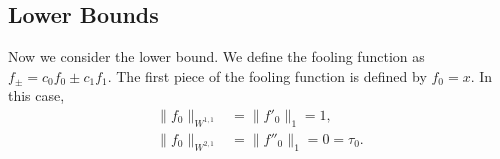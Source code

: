 %
%
%
%


\subsection{Lower Bounds}
Now we consider the lower bound. We define the fooling function as $f_{\pm}=c_0f_0\pm c_1f_1$. The first piece of the fooling function is defined by $f_0=x$. In this case,
\begin{align*}
    \|f_0\|_{W^{1,1}}&=\|f'_0\|_1=1,\\
    \|f_0\|_{W^{2,1}}&=\|f''_0\|_1=0=\tau_0.
\end{align*}

